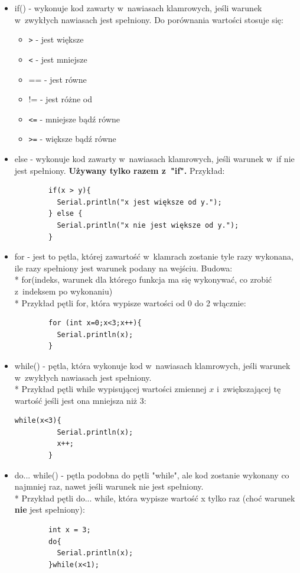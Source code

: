 \documentclass[a4paper,12pt, twoside]{article}
\begin{document}
	\begin{itemize}
		\item if(){} - wykonuje kod zawarty w~nawiasach klamrowych, jeśli warunek w~zwykłych nawiasach jest spełniony. Do porównania wartości stosuje się:
			\begin{itemize}
				\item \verb|>| - jest większe
				\item \verb|<|  - jest mniejsze
				\item == - jest równe
				\item != - jest różne od
				\item \verb|<=| - mniejsze bądź równe
				\item \verb|>=| - większe bądź równe
			\end{itemize}
		\item else - wykonuje kod zawarty w~nawiasach klamrowych, jeśli warunek w~if nie jest spełniony. \textbf{Używany tylko razem z~"if".} Przykład:
		\begin{verbatim}
		if(x > y){
		  Serial.println("x jest większe od y.");
		} else {
		  Serial.println("x nie jest większe od y.");
		}
		\end{verbatim}
		\item for - jest to pętla, której zawartość w~klamrach zostanie tyle razy wykonana, ile razy spełniony jest warunek podany na wejściu. Budowa:\\*
		for(indeks, warunek dla którego funkcja ma się wykonywać, co zrobić z~indeksem po wykonaniu){}\\*
		Przykład pętli for, która wypisze wartości od 0 do 2 włącznie:
		\begin{verbatim}
		for (int x=0;x<3;x++){
		  Serial.println(x);
		}
		\end{verbatim}
		\item while() - pętla, która wykonuje kod w~nawiasach klamrowych, jeśli warunek w~zwykłych nawiasach jest spełniony.\\*
		Przykład pętli while wypisującej wartości zmiennej $x$ i~zwiększającej tę wartość jeśli jest ona mniejsza niż 3:
		\begin{verbatim}while(x<3){
		  Serial.println(x);
		  x++;
		}
		\end{verbatim}
		\item do... while() - pętla podobna do pętli "while", ale kod zostanie wykonany co najmniej raz, nawet jeśli warunek nie jest spełniony. \\*
		Przykład pętli do... while, która wypisze wartość x tylko raz (choć warunek \textbf{nie} jest spełniony):
		\begin {verbatim}
		int x = 3;
		do{
		  Serial.println(x);
		}while(x<1);
		\end{verbatim}
		
	\end{itemize}
\end{document}
